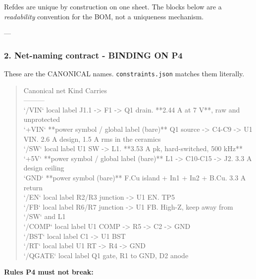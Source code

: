 \documentclass[11pt,a4paper]{article}
\begin{document}
Refdes are unique by construction on one sheet. The blocks below are a \emph{readability} convention for the BOM, not a uniqueness mechanism.

---

\subsubsection*{2. Net-naming contract - BINDING ON P4}
These are the CANONICAL names. \texttt{constraints.json} matches them literally.

\begin{quote}\small\ttfamily\raggedright
\textbar{} Canonical net \textbar{} Kind \textbar{} Carries \textbar{}\\
\textbar{}---\textbar{}---\textbar{}---\textbar{}\\
\textbar{} `/VIN` \textbar{} local label \textbar{} J1.1 -\textgreater{} F1 -\textgreater{} Q1 drain. {*}{*}2.44 A at 7 V{*}{*}, raw and unprotected \textbar{}\\
\textbar{} `+VIN` \textbar{} {*}{*}power symbol / global label (bare){*}{*} \textbar{} Q1 source -\textgreater{} C4-C9 -\textgreater{} U1 VIN. 2.6 A design, 1.5 A rms in the ceramics \textbar{}\\
\textbar{} `/SW` \textbar{} local label \textbar{} U1 SW -\textgreater{} L1. {*}{*}3.53 A pk, hard-switched, 500 kHz{*}{*} \textbar{}\\
\textbar{} `+5V` \textbar{} {*}{*}power symbol / global label (bare){*}{*} \textbar{} L1 -\textgreater{} C10-C15 -\textgreater{} J2. 3.3 A design ceiling \textbar{}\\
\textbar{} `GND` \textbar{} {*}{*}power symbol (bare){*}{*} \textbar{} F.Cu island + In1 + In2 + B.Cu. 3.3 A return \textbar{}\\
\textbar{} `/EN` \textbar{} local label \textbar{} R2/R3 junction -\textgreater{} U1 EN. TP5 \textbar{}\\
\textbar{} `/FB` \textbar{} local label \textbar{} R6/R7 junction -\textgreater{} U1 FB. High-Z, keep away from `/SW` and L1 \textbar{}\\
\textbar{} `/COMP` \textbar{} local label \textbar{} U1 COMP -\textgreater{} R5 -\textgreater{} C2 -\textgreater{} GND \textbar{}\\
\textbar{} `/BST` \textbar{} local label \textbar{} C1 -\textgreater{} U1 BST \textbar{}\\
\textbar{} `/RT` \textbar{} local label \textbar{} U1 RT -\textgreater{} R4 -\textgreater{} GND \textbar{}\\
\textbar{} `/QGATE` \textbar{} local label \textbar{} Q1 gate, R1 to GND, D2 anode \textbar{}
\end{quote}
\textbf{Rules P4 must not break:}
\end{document}
